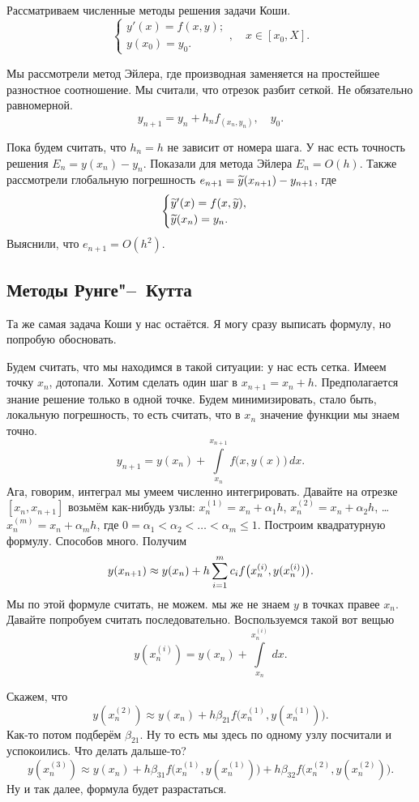 Рассматриваем численные методы решения задачи Коши.
\[
 \begin{cases}
 y'(x) = f(x,y);\\
 y(x_0) = y_0.
\end{cases},\quad x\in [x_0,X].
\]

Мы рассмотрели метод Эйлера, где производная заменяется на простейшее разностное соотношение. Мы считали, что отрезок разбит сеткой. Не обязательно равномерной.
\[
  y_{n+1} = y_n  + h_n f_(x_n,y_n),\quad y_0.
\]

Пока будем считать, что $h_n = h$ не зависит от номера шага. У нас есть точность решения $E_n = y(x_n) - y_n$. Показали для метода Эйлера $E_n = O(h)$. Также рассмотрели глобальную погрешность $e_{n+1} = \widetilde{y}{}(x_{n+1}) - y_{n+1}$, где
\[
  \begin{cases}
\widetilde{y}{}'(x) = f(x,\widetilde{y}{}),\\
\widetilde{y}{}(x_n) = y_n.
\end{cases}
\]
Выяснили, что $e_{n+1} = O(h^2)$.

\subsection{Методы Рунге"--~Кутта}
Та же самая задача Коши у нас остаётся. Я могу сразу выписать формулу, но попробую обосновать.

Будем считать, что мы находимся в такой ситуации: у нас есть сетка. Имеем точку $x_n$, дотопали. Хотим сделать один шаг в $x_{n+1} = x_n + h$. Предполагается знание решение только в одной точке. Будем минимизировать, стало быть, локальную погрешность, то есть считать, что в $x_n$ значение функции мы знаем точно.
\[
  y_{n+1} = y(x_n) + \int\limits_{x_n}^{x_{n+1}} f\big(x,y(x)\big)\,dx.
\]
Ага, говорим, интеграл мы умеем численно интегрировать. Давайте на отрезке $[x_n,x_{n+1}]$ возьмём как-нибудь узлы: $x_n^{(1)} = x_n + \alpha_1 h$, $x_{n}^{(2)} = x_n + \alpha_2 h$, \dots $x_n^{(m)} = x_n + \alpha_m h$, где $0=\alpha_1 <\alpha_2<\dots<\alpha_m\le 1$. Построим квадратурную формулу. Способов много. Получим
\[
  y(x_{n+1}) \approx y(x_n) + h \sum\limits_{i = 1}^{m} c_i f\big(x_n^{(i)},y(x_n^{(i)})\big).
\]
Мы по этой формуле считать, не можем. мы же не знаем $y$ в точках правее $x_n$. Давайте попробуем считать последовательно. Воспользуемся такой вот вещью 
\[
y(x_n^{(i)}) = y(x_n) + \int\limits_{x_n}^{x_n^{(i)}}\,dx.
\]

Скажем, что
\[
  y(x_n^{(2)})\approx y(x_n) + h \beta_{21} f\big(x_n^{(1)},y(x_n^{(1)})\big).
\]
Как-то потом подберём $\beta_{21}$. Ну то есть мы здесь по одному узлу посчитали и успокоились. Что делать дальше-то?
\[
  y(x_{n}^{(3)}) \approx y(x_n) + h \beta_{31} f\big(x_n^{(1)}, y(x_n^{(1)})\big) + h \beta_{32} f\big(x_n^{(2)},y(x_n^{(2)})\big).
\]
Ну и так далее, формула будет разрастаться.

